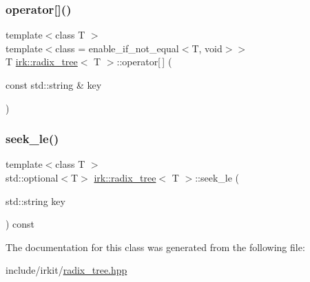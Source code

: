 \mbox{\label{classirk_1_1radix__tree_af46c8d034084c54b33bb761ec96588d4}} 
\subsubsection{\texorpdfstring{operator[]()}{operator[]()}}
{\footnotesize\ttfamily template$<$class T $>$ \\
template$<$class  = enable\+\_\+if\+\_\+not\+\_\+equal$<$\+T, void$>$$>$ \\
T \mbox{\hyperlink{classirk_1_1radix__tree}{irk\+::radix\+\_\+tree}}$<$ T $>$\+::operator\mbox{[}$\,$\mbox{]} (\begin{DoxyParamCaption}\item[{const std\+::string \&}]{key }\end{DoxyParamCaption})\hspace{0.3cm}{\ttfamily [inline]}}

\mbox{\label{classirk_1_1radix__tree_aec3e27fbf3cd3f0e2d75183d392b0946}} 
\subsubsection{\texorpdfstring{seek\+\_\+le()}{seek\_le()}}
{\footnotesize\ttfamily template$<$class T $>$ \\
std\+::optional$<$T$>$ \mbox{\hyperlink{classirk_1_1radix__tree}{irk\+::radix\+\_\+tree}}$<$ T $>$\+::seek\+\_\+le (\begin{DoxyParamCaption}\item[{std\+::string}]{key }\end{DoxyParamCaption}) const\hspace{0.3cm}{\ttfamily [inline]}}



The documentation for this class was generated from the following file\+:\begin{DoxyCompactItemize}
\item 
include/irkit/\mbox{\hyperlink{radix__tree_8hpp}{radix\+\_\+tree.\+hpp}}\end{DoxyCompactItemize}
